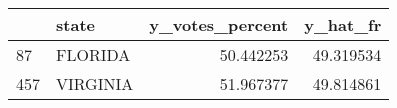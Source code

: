 \begin{tabular}{llrr}
\toprule
{} &     state &  y\_votes\_percent &   y\_hat\_fr \\
\midrule
87  &   FLORIDA &        50.442253 &  49.319534 \\
457 &  VIRGINIA &        51.967377 &  49.814861 \\
\bottomrule
\end{tabular}
